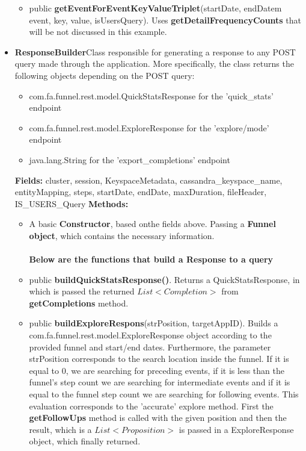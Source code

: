 \documentclass{article}
\begin{document}
\begin{itemize}
\begin{itemize}
	\item public \textbf{getEventForEventKeyValueTriplet}(startDate, endDatem event, key, value, isUsersQuery). Uses \textbf{getDetailFrequencyCounts} that will be not discussed in this example.
\end{itemize}
\item \textbf{ResponseBuilder}Class responsible for generating a response to any POST query made through the application.
More specifically, the class returns the following objects depending on the POST query:\\
\begin{itemize}
	\item com.fa.funnel.rest.model.QuickStatsResponse for the 'quick\_stats' endpoint
	\item com.fa.funnel.rest.model.ExploreResponse for the 'explore/{mode}' endpoint
	\item java.lang.String for the 'export\_completions' endpoint
\end{itemize}
\textbf{Fields:} cluster, session, KeyspaceMetadata, cassandra\_keyspace\_name, entityMapping, steps, startDate, endDate, maxDuration, fileHeader, IS\_USERS\_Query
\textbf{Methods:}\\
\begin{itemize}
	\item A basic \textbf{Constructor}, based onthe fields above. Passing a \textbf{Funnel object}, which contains the necessary information.\\
	\\
	\textbf{Below are the functions that build a Response to a query}
	\item public \textbf{buildQuickStatsResponse()}. Returns a QuickStatsResponse, in which is passed the returned $List<Completion>$ from \textbf{getCompletions} method.
	\item public \textbf{buildExploreRespons}(strPosition, targetAppID). Builds a  com.fa.funnel.rest.model.ExploreResponse object according to the provided funnel and start/end dates. Furthermore, the parameter strPosition	corresponds to the search location inside the funnel. If it is equal to 0, we are searching for preceding events, if it is less than the funnel's step count we are searching for intermediate events and if it is equal to the funnel step count we are searching for following events. This evaluation corresponds to the 'accurate' explore method. First the \textbf{getFollowUps} method is called with the given position and then the result, which is a $List<Proposition>$ is passed in a ExploreResponse object, which finally returned.

\end{itemize}
\end{itemize}
\end{document}
